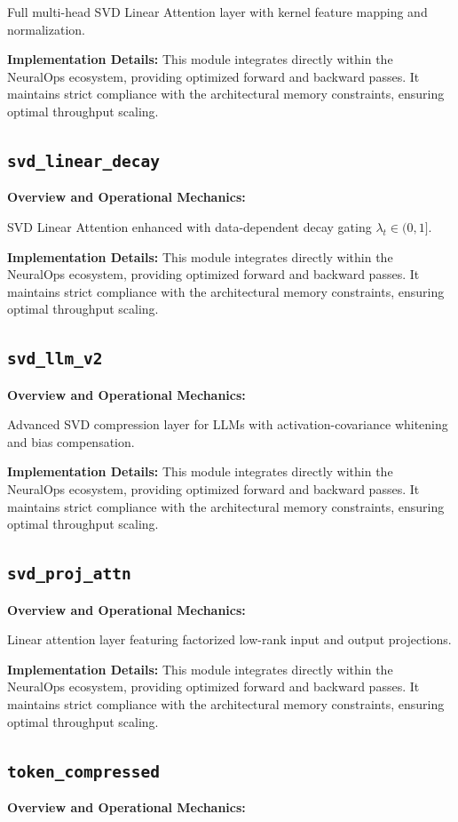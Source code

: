 \documentclass[10pt,twocolumn,letterpaper]{article}
\begin{document}
Full multi-head SVD Linear Attention layer with kernel feature mapping and normalization.

\textbf{Implementation Details:}
This module integrates directly within the NeuralOps ecosystem, providing optimized forward and backward passes. It maintains strict compliance with the architectural memory constraints, ensuring optimal throughput scaling.

\subsection{\texttt{svd\_linear\_decay}}
\textbf{Overview and Operational Mechanics:}

SVD Linear Attention enhanced with data-dependent decay gating $\lambda_t \in (0, 1]$.

\textbf{Implementation Details:}
This module integrates directly within the NeuralOps ecosystem, providing optimized forward and backward passes. It maintains strict compliance with the architectural memory constraints, ensuring optimal throughput scaling.

\subsection{\texttt{svd\_llm\_v2}}
\textbf{Overview and Operational Mechanics:}

Advanced SVD compression layer for LLMs with activation-covariance whitening and bias compensation.

\textbf{Implementation Details:}
This module integrates directly within the NeuralOps ecosystem, providing optimized forward and backward passes. It maintains strict compliance with the architectural memory constraints, ensuring optimal throughput scaling.

\subsection{\texttt{svd\_proj\_attn}}
\textbf{Overview and Operational Mechanics:}

Linear attention layer featuring factorized low-rank input and output projections.

\textbf{Implementation Details:}
This module integrates directly within the NeuralOps ecosystem, providing optimized forward and backward passes. It maintains strict compliance with the architectural memory constraints, ensuring optimal throughput scaling.

\subsection{\texttt{token\_compressed}}
\textbf{Overview and Operational Mechanics:}
\end{document}
